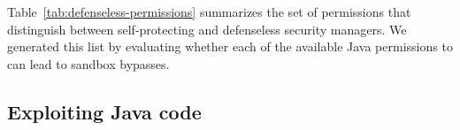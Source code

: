 \documentclass{sig-alternate}
\begin{document}
Table~\ref{tab:defenseless-permissions} summarizes the set of permissions
that distinguish between self-protecting and defenseless security
managers. We generated this list by evaluating whether each of the available Java permissions to
can lead to sandbox bypasses. 

\subsection{Exploiting Java code}
\label{sec:javaexploits}

\end{document}
